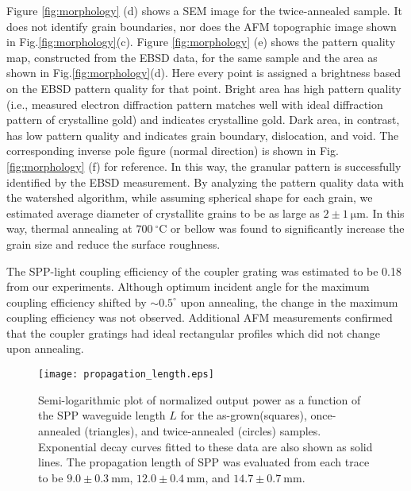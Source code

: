 \documentclass[aip,apl,reprint]{revtex4-1}
\begin{document}
\color{red}Figure \ref{fig:morphology} (d) shows \color{black}a SEM image for the twice-annealed sample. \color{red}It does not identify grain boundaries, nor does the AFM topographic image shown in Fig.\ref{fig:morphology}(c).
Figure \ref{fig:morphology} (e) shows the pattern quality map, \color{black}constructed from the EBSD data, for the same sample and the area as shown in Fig.\ref{fig:morphology}(d). \color{red}Here every point is assigned a brightness based on the EBSD pattern quality for that point. \color{black}Bright \color{red}area \color{black}has high pattern quality (i.e., measured electron diffraction pattern matches well with ideal diffraction pattern of crystalline gold) and indicates crystalline gold. Dark \color{red}area, \color{black}in contrast, has low pattern quality and indicates grain boundary, dislocation, and void. The corresponding inverse pole figure (normal direction) is shown in Fig. \ref{fig:morphology} (f) for reference. \color{red}In this way, the granular pattern is successfully identified by the EBSD measurement. By analyzing the pattern quality data with the watershed algorithm\cite{Petr}, while assuming spherical shape for each grain, we estimated average diameter of crystallite grains to be as large as $2\pm1\:\mathrm{\mu m}$. \color{black}In this way, thermal annealing at $700\:^\circ\mathrm{C}$ or bellow was found to significantly increase the grain size and reduce the surface roughness.

The SPP-light coupling efficiency of the coupler grating \color{red}was \color{black}estimated to be 0.18 \color{red}from \color{black}our experiments. Although optimum incident angle for the maximum coupling efficiency shifted by $\sim0.5^\circ$ upon annealing, the change in the maximum coupling efficiency was not observed. \color{red}Additional \color{black}AFM measurements confirmed that the coupler gratings had ideal rectangular profiles which did not change \color{red}upon annealing.\color{black} 

 \begin{figure}
    \texttt{[image: propagation\_length.eps]}
    \caption{\color{red}Semi-logarithmic plot of \color{black}normalized output power as a function of the SPP waveguide length $L$ for the as-grown(\color{red}squares\color{black}), once-annealed (\color{red}triangles\color{black}), and twice-annealed (\color{red}circles\color{black}) samples. \color{red}Exponential decay curves fitted to these data are also shown as solid lines. \color{black}The propagation length of SPP was evaluated from each trace to be $9.0\pm0.3\:\mathrm{mm}$, $12.0\pm0.4\:\mathrm{mm}$, and $14.7\pm0.7\:\mathrm{mm}$.}
       \label{fig:propagation_length}
\end{figure}
\end{document}
